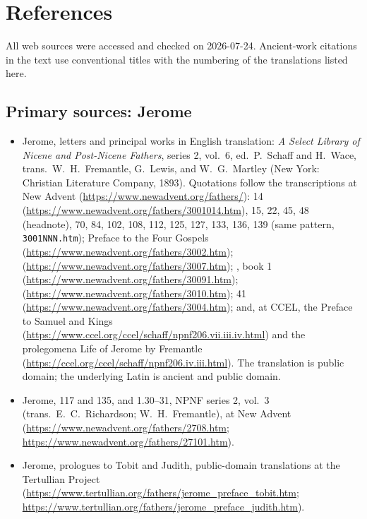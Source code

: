 \section{References}

\begingroup
\raggedright

All web sources were accessed and checked on 2026-07-24. Ancient-work
citations in the text use conventional titles with the numbering of the
translations listed here.

\subsection*{Primary sources: Jerome}

\begin{itemize}
\item Jerome, letters and principal works in English translation:
\textit{A Select Library of Nicene and Post-Nicene Fathers}, series 2,
vol.~6, ed.\ P.~Schaff and H.~Wace, trans.\ W.~H.~Fremantle, G.~Lewis, and
W.~G.~Martley (New York: Christian Literature Company, 1893). Quotations
follow the transcriptions at New Advent
(\url{https://www.newadvent.org/fathers/}):  14
(\url{https://www.newadvent.org/fathers/3001014.htm}), 15, 22, 45, 48
(headnote), 70, 84, 102, 108, 112, 125, 127, 133, 136, 139 (same pattern,
\texttt{3001NNN.htm}); Preface to the Four Gospels
(\url{https://www.newadvent.org/fathers/3002.htm}); 
(\url{https://www.newadvent.org/fathers/3007.htm}); , book 1 (\url{https://www.newadvent.org/fathers/30091.htm});
(\url{https://www.newadvent.org/fathers/3010.htm});  41
(\url{https://www.newadvent.org/fathers/3004.htm}); and, at CCEL, the
Preface to Samuel and Kings
(\url{https://www.ccel.org/ccel/schaff/npnf206.vii.iii.iv.html}) and the
prolegomena Life of Jerome by Fremantle
(\url{https://ccel.org/ccel/schaff/npnf206.iv.iii.html}). The translation is
public domain; the underlying Latin is ancient and public domain.
\item Jerome,  117 and 135, and  1.30--31, NPNF series 2, vol.~3 (trans.\ E.~C.~Richardson;
W.~H.~Fremantle), at New Advent
(\url{https://www.newadvent.org/fathers/2708.htm};
\url{https://www.newadvent.org/fathers/27101.htm}).
\item Jerome, prologues to Tobit and Judith, public-domain translations at
the Tertullian Project
(\url{https://www.tertullian.org/fathers/jerome_preface_tobit.htm};
\url{https://www.tertullian.org/fathers/jerome_preface_judith.htm}).
\end{itemize}

